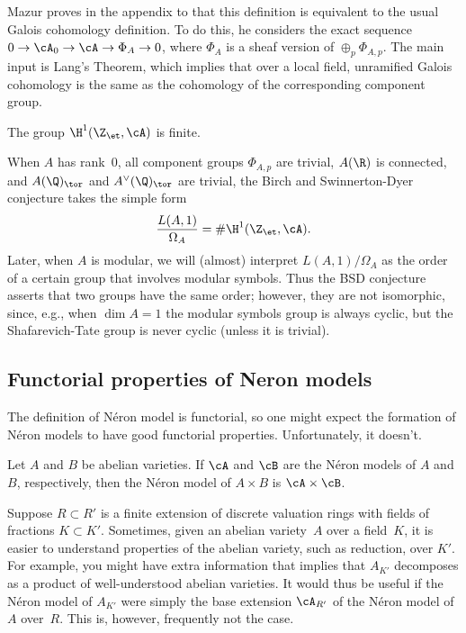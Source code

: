 \documentclass{report}
\begin{document}
Mazur proves in the appendix to \cite{mazur:tower} that this
definition is equivalent to the usual Galois cohomology
definition.  To do this, he considers the exact sequence $0\to
\cA_0 \to \cA \to \Phi_A \to 0$, where $\Phi_A$ is a sheaf version
of $\oplus_{p} \Phi_{A,p}$. The main input is Lang's Theorem,
which implies that over a local field, unramified Galois
cohomology is the same as the cohomology of the corresponding
component group.

\begin{conjecture}
The group $\H^1(\Z_{\et},\cA)$ is finite.
\end{conjecture}

When $A$ has rank~$0$, all component groups $\Phi_{A,p}$ are
trivial, $A(\R)$ is connected, and $A(\Q)_{\tor}$ and
$A^{\vee}(\Q)_{\tor}$ are trivial, the Birch and Swinnerton-Dyer
conjecture takes the simple form
\[
  \frac{L(A,1)}{\Omega_A}  = \#\H^1(\Z_{\et},\cA).
\]
Later, when $A$ is modular, we will (almost)
interpret $L(A,1)/\Omega_A$ as the order of a certain group that
involves modular symbols.   Thus the BSD conjecture asserts that
two groups have the same order; however, they are not isomorphic,
since, e.g., when $\dim A=1$ the modular symbols group is always
cyclic, but the Shafarevich-Tate group is never cyclic (unless it
is trivial).


\subsection{Functorial properties of Neron models}
The definition of N\'eron model is functorial, so one might expect
the formation of N\'eron models to have good functorial
properties.  Unfortunately, it doesn't.

\begin{proposition}
Let $A$ and $B$ be abelian varieties.  If $\cA$ and $\cB$ are the
N\'eron models of $A$ and $B$, respectively, then the N\'eron
model of $A\times B$ is $\cA\times \cB$.
\end{proposition}

Suppose $R\subset R'$ is a finite extension of discrete valuation
rings with fields of fractions $K\subset K'$.  Sometimes, given an
abelian variety~$A$ over a field~$K$, it is easier to understand
properties of the abelian variety, such as reduction, over $K'$.
For example, you might have extra information that implies that
$A_{K'}$ decomposes as a product of well-understood abelian
varieties.  It would thus be useful if the N\'eron model of
$A_{K'}$ were simply the base extension $\cA_{R'}$ of the N\'eron
model of $A$ over~$R$. This is, however, frequently not the case.
\end{document}
